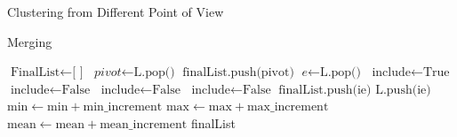 \begin{subsection}{Clustering from Different Point of View}
\begin{subsubsection}{Merging}
\begin{algorithm}
\begin{algorithmic}[1]
\State $\text{FinalList} \gets \text{[ ]}$
\State $\textit{pivot} \gets \text{L.pop()}$
\State $\text{finalList.push(pivot)}$
\State $\textit{e} \gets \text{L.pop()}$
\State $\text{include} \gets \text{True}$
\State $\text{include} \gets \text{False}$
\Break
\EndIf
{} 
\State $\text{include} \gets \text{False}$
\Break
\EndIf
{} 
\State $\text{include} \gets \text{False}$
\Break
\EndIf
\EndFor
{} 
\State $\text{finalList.push(ie)}$
\Else
\State $\text{L.push(ie)}$
\EndIf
\State $\text{min} \gets \text{min} + \text{min\_increment}$
\State $\text{max} \gets \text{max} + \text{max\_increment}$
\State $\text{mean} \gets \text{mean} + \text{mean\_increment}$
\EndWhile
\Return finalList
\EndProcedure
\end{algorithmic}
\end{algorithm}

\end{subsubsection}

\end{subsection}



